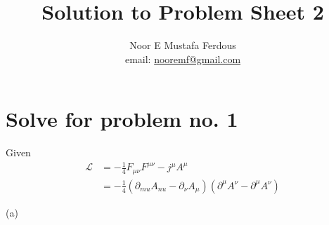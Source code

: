 \documentclass[12pt, letterpaper]{article}
\title{Solution to Problem Sheet 2}
\author{Noor E Mustafa Ferdous\\ email: \href{mailto:nooremf@gmail.com}{nooremf@gmail.com} }
\date{}
\newcommand*{\1}{\hspace{1pt}}
\begin{document}
\maketitle

\section*{Solve for problem no. 1}

Given
\begin{align*}
    \mathcal{L} &= -\frac{1}{4}F_{\mu \nu} F^{\mu \nu} - j^{\mu} A^{\mu} \\
    &= -\frac{1}{4}(\partial_{mu}A_{nu} - \partial_{\nu}A_{\mu})(\partial^{\mu} A^{\nu} - \partial^{\mu} A^{\nu})
\end{align*}

(a)
\end{document}
